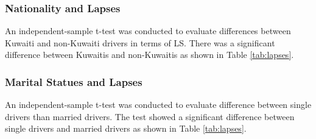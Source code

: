 \documentclass[preprint,12pt,a4paper,authoryear]{elsarticle}
\begin{document}
\subsubsection{Nationality and Lapses}
An independent-sample t-test was conducted to evaluate differences between Kuwaiti and non-Kuwaiti drivers in terms of LS. There was a significant difference between Kuwaitis and non-Kuwaitis as shown in Table \ref{tab:lapses}.

\subsubsection{Marital Statues and Lapses}
An independent-sample t-test was conducted to evaluate difference between single drivers than married drivers. The test showed a significant difference between single drivers and married drivers as shown in Table \ref{tab:lapses}.

\begin{table}[H]
\centering
\caption{Results of t-tests for LS.}
\label{tab:lapses}
\end{table}
\end{document}
